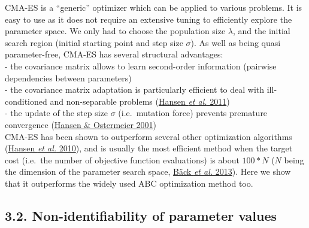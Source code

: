 \documentclass[11pt,]{article}
\begin{document}
CMA-ES is a ``generic'' optimizer which can be applied to various
problems. It is easy to use as it does not require an extensive tuning
to efficiently explore the parameter space. We only had to choose the
population size \(\lambda\), and the initial search region (initial
starting point and step size \(\sigma\)). As well as being quasi
parameter-free, CMA-ES has several structural advantages:\\
- the covariance matrix allows to learn second-order information
(pairwise dependencies between parameters)\\
- the covariance matrix adaptation is particularly efficient to deal
with ill-conditioned and non-separable problems
(\protect\hyperlink{ref-Hansen2011}{Hansen \emph{et al.} 2011})\\
- the update of the step size \(\sigma\) (i.e.~mutation force) prevents
premature convergence (\protect\hyperlink{ref-Hansen2001}{Hansen \&
Ostermeier 2001})\\
CMA-ES has been shown to outperform several other optimization
algorithms (\protect\hyperlink{ref-Hansen2010}{Hansen \emph{et al.}
2010}), and is usually the most efficient method when the target cost
(i.e.~the number of objective function evaluations) is about \(100*N\)
(\(N\) being the dimension of the parameter search space,
\protect\hyperlink{ref-Baeck2013}{Bäck \emph{et al.} 2013}). Here we
show that it outperforms the widely used ABC optimization method too.

\hypertarget{non-identifiability-of-parameter-values}{%
\subsection{3.2. Non-identifiability of parameter
values}\label{non-identifiability-of-parameter-values}}
\end{document}
